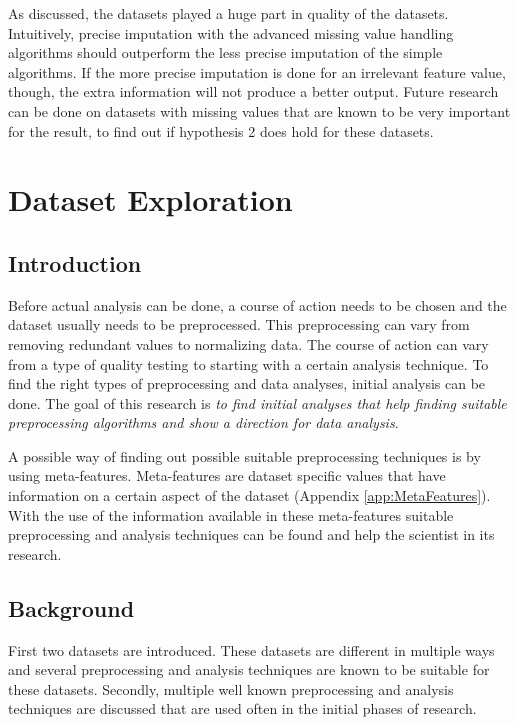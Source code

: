\documentclass[10pt,a4paper]{report}
\begin{document}
	As discussed, the datasets played a huge part in quality of the datasets. Intuitively, precise imputation with the advanced missing value handling algorithms should outperform the less precise imputation of the simple algorithms. If the more precise imputation is done for an irrelevant feature value, though, the extra information will not produce a better output. Future research can be done on datasets with missing values that are known to be very important for the result, to find out if hypothesis 2 does hold for these datasets.
	
	\chapter{Dataset Exploration}
	\label{chap:DatasetExploration}
	
	\section{Introduction}
	\label{DEsec:Introduction}
	
	Before actual analysis can be done, a course of action needs to be chosen and the dataset usually needs to be preprocessed. This preprocessing can vary from removing redundant values to normalizing data. The course of action can vary from a type of quality testing to starting with a certain analysis technique. To find the right types of preprocessing and data analyses, initial analysis can be done. The goal of this research is \emph{to find initial analyses that help finding suitable preprocessing algorithms and show a direction for data analysis}.
	
	A possible way of finding out possible suitable preprocessing techniques is by using meta-features. Meta-features are dataset specific values that have information on a certain aspect of the dataset\cite{kluegl2009meta} (Appendix \ref{app:MetaFeatures}). With the use of the information available in these meta-features suitable preprocessing and analysis techniques can be found and help the scientist in its research.
	
	\section{Background}
	\label{DEsec:Background}
	
	First two datasets are introduced. These datasets are different in multiple ways and several preprocessing and analysis techniques are known to be suitable for these datasets. Secondly, multiple well known preprocessing and analysis techniques are discussed that are used often in the initial phases of research.
	
\end{document}
